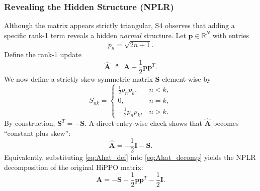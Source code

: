 \documentclass[a4paper,11pt]{article}
\begin{document}
\subsubsection{Revealing the Hidden Structure (NPLR)}
Although the matrix appears strictly triangular, S4 observes that adding a specific rank-1 term reveals a hidden \emph{normal} structure. Let $\mathbf{p}\in\mathbb{R}^N$ with entries
\begin{equation}
    p_n = \sqrt{2n+1}.
\end{equation}
Define the rank-1 update
\begin{equation}\label{eq:Ahat_def}
    \widehat{\mathbf{A}} \;\triangleq\; \mathbf{A} + \frac{1}{2}\mathbf{p}\mathbf{p}^T.
\end{equation}
We now define a strictly skew-symmetric matrix $\mathbf{S}$ element-wise by
\begin{equation}\label{eq:S_def}
S_{nk}=
\begin{cases}
\frac{1}{2}p_np_k, & n<k,\\
0, & n=k,\\
-\frac{1}{2}p_np_k, & n>k.
\end{cases}
\end{equation}
By construction, $\mathbf{S}^T=-\mathbf{S}$. A direct entry-wise check shows that $\widehat{\mathbf{A}}$ becomes ``constant plus skew'':
\begin{equation}\label{eq:Ahat_decomp}
    \widehat{\mathbf{A}} = -\frac{1}{2}\mathbf{I} - \mathbf{S}.
\end{equation}
Equivalently, substituting \eqref{eq:Ahat_def} into \eqref{eq:Ahat_decomp} yields the NPLR decomposition of the original HiPPO matrix:
\begin{equation} \label{eq:nplr_decomp}
    \mathbf{A} = -\mathbf{S} - \frac{1}{2}\mathbf{p}\mathbf{p}^T - \frac{1}{2}\mathbf{I}.
\end{equation}
\end{document}
